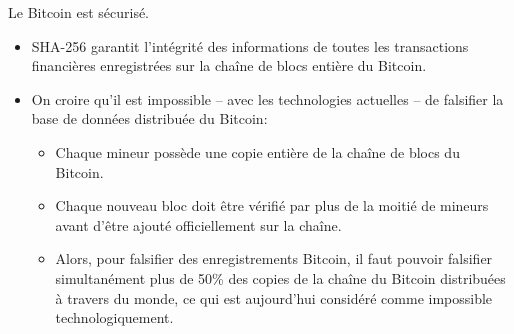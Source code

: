 

\begin{frame}{\LARGE Le Bitcoin est s\'ecuris\'e.}

\normalsize

\begin{itemize}
\item
	SHA-256 garantit l'int\'egrit\'e des informations de
	toutes les transactions financi\`eres enregistr\'ees
	sur la cha\^ine de blocs enti\`ere du Bitcoin.

\vskip 0.4cm
\item
	On croire qu'il est impossible -- avec les technologies actuelles --
	de falsifier la base de donn\'ees distribu\'ee du Bitcoin:
	\vskip 0.05cm
	\begin{itemize}
	\item
		Chaque mineur poss\`ede une copie enti\`ere de la cha\^ine de blocs du Bitcoin.
	\vskip 0.15cm
	\item
		Chaque nouveau bloc doit \^etre v\'erifi\'e par plus de la moiti\'e de mineurs
		avant d'\^etre ajout\'e officiellement sur la cha\^ine.
	\vskip 0.15cm
	\item
		Alors, pour falsifier des enregistrements Bitcoin, il faut pouvoir falsifier
		{\color{red}simultan\'ement plus de 50\%} des copies
		de la cha\^ine du Bitcoin distribu\'ees \`a travers du monde,
		ce qui est aujourd'hui consid\'er\'e comme impossible technologiquement.
	\end{itemize}
\end{itemize}

\end{frame}
\normalsize

